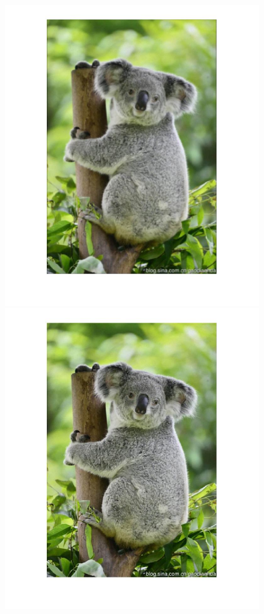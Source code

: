 \documentclass{article}
\theoremstyle{plain} \newtheorem{thm}{Theorem}
\begin{document}
\begin{figure}
\begin{minipage}{.5\linewidth}
		\includegraphics[width=\textwidth]{koala_blurred.jpg}
	\end{minipage}
	\begin{minipage}{.5\linewidth}
		\includegraphics[width=\linewidth]{koala_recovered.jpg}
	\end{minipage}
\end{figure}
\end{document}
